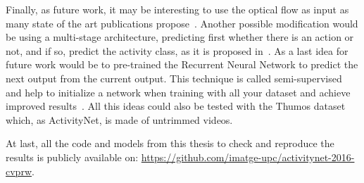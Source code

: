 Finally, as future work, it may be interesting to use the optical flow as input as many state of the art publications propose~\cite{simonyan2014two,Ng_2015_CVPR,yao2015describing}. Another possible modification would be using a multi-stage architecture, predicting first whether there is an action or not, and if so, predict the activity class, as it is proposed in~\cite{shoutemporal}.
As a last idea for future work would be to pre-trained the Recurrent Neural Network to predict the next output from the current output. This technique is called semi-supervised and help to initialize a network when training with all your dataset and achieve improved results~\cite{harvey2015semi}.
All this ideas could also be tested with the Thumos dataset which, as ActivityNet, is made of untrimmed videos.

At last, all the code and models from this thesis to check and reproduce the results is publicly available on: \url{https://github.com/imatge-upc/activitynet-2016-cvprw}.






